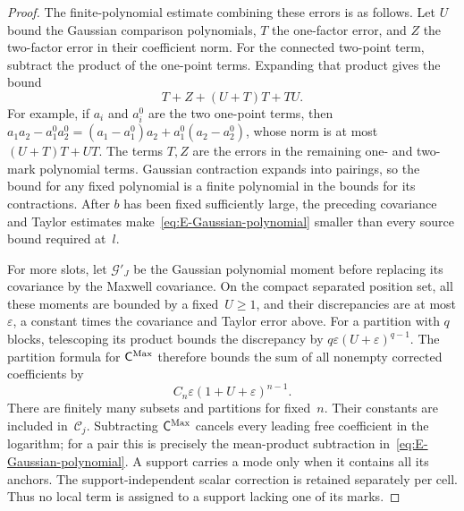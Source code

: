 \begin{proof}
The finite-polynomial estimate combining these errors is as follows. Let $U$ bound the Gaussian comparison polynomials, $T$ the one-factor error, and $Z$ the two-factor error in their coefficient norm. For the connected two-point term, subtract the product of the one-point terms. Expanding that product gives the bound
\begin{equation}\label{eq:E-Gaussian-polynomial}
 T+Z+(U+T)T+TU.
\end{equation}
For example, if $a_i$ and $a_i^0$ are the two one-point terms, then
$a_1a_2-a_1^0a_2^0=(a_1-a_1^0)a_2+a_1^0(a_2-a_2^0)$, whose norm is at most $(U+T)T+UT$. The terms $T,Z$ are the errors in the remaining one- and two-mark polynomial terms. Gaussian contraction expands into pairings, so the bound for any fixed polynomial is a finite polynomial in the bounds for its contractions. After $b$ has been fixed sufficiently large, the preceding covariance and Taylor estimates make~\eqref{eq:E-Gaussian-polynomial} smaller than every source bound required at~$l$.

For more slots, let $\mathcal G'_J$ be the Gaussian polynomial moment before replacing its covariance by the Maxwell covariance. On the compact separated position set, all these moments are bounded by a fixed~$U\ge1$, and their discrepancies are at most $\varepsilon$, a constant times the covariance and Taylor error above. For a partition with $q$ blocks, telescoping its product bounds the discrepancy by $q\varepsilon(U+\varepsilon)^{q-1}$. The partition formula for $\mathsf C^{\rm Max}$ therefore bounds the sum of all nonempty corrected coefficients by
\begin{equation*}
 C_n\varepsilon(1+U+\varepsilon)^{n-1}.
\end{equation*}
There are finitely many subsets and partitions for fixed~$n$. Their constants are included in~$\mathcal C_j$. Subtracting $\mathsf C^{\rm Max}$ cancels every leading free coefficient in the logarithm; for a pair this is precisely the mean-product subtraction in~\eqref{eq:E-Gaussian-polynomial}. A support carries a mode only when it contains all its anchors. The support-independent scalar correction is retained separately per cell. Thus no local term is assigned to a support lacking one of its marks.


\end{proof}
